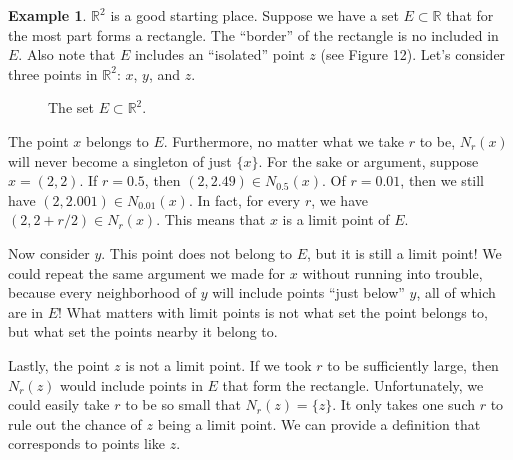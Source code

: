 \documentclass{article}
\newcommand{\R}{\mathbb{R}}
\theoremstyle{definition}
\newtheorem{example}{Example}[section]
\begin{document}
\begin{example}
$\R^2$ is a good starting place. Suppose we have a set $ E\subset \R $ that for the most part forms a rectangle. The ``border'' of the rectangle is no included in $ E $. Also note that $ E $ includes an ``isolated'' point $ z $ (see Figure 12). Let's consider three points in $ \R^2 $: $ x $, $ y $, and $ z $.  
		\begin{figure}[h]
	\centering
	\caption{The set $ E\subset \R^2 $.}
\end{figure}

The point $ x $ belongs to $ E $. Furthermore, no matter what we take $ r $ to be, $ N_r(x) $ will never become a singleton of just $ \{x\} $. For the sake or argument, suppose $ x=(2,2) $. If $ r=0.5 $, then $ (2,2.49)\in N_{0.5}(x) $. Of $ r=0.01 $, then we still have $ (2,2.001)\in N_{0.01}(x) $. In fact, for every $ r $, we have $ (2,2+r/2)\in N_r(x) $. This means that $ x $ is a limit point of $ E $. 

Now consider $ y $. This point does not belong to $ E $, but it is still a limit point! We could repeat the same argument we made for $ x $ without running into trouble, because every neighborhood of $ y $ will include points ``just below'' $ y $, all of which are in $ E $! What matters with limit points is not what set the point belongs to, but what set the points nearby it belong to. 

Lastly, the point $ z $ is not a limit point. If we took $ r $ to be sufficiently large, then $ N_r(z) $ would include points in $ E $ that form the rectangle. Unfortunately, we could easily take $ r$ to be so small that $ N_r(z)=\{z\} $. It only takes one such $ r $ to rule out the chance of $ z $ being a limit point. We can provide a definition that corresponds to points like $ z $.     
\end{example}
\end{document}
